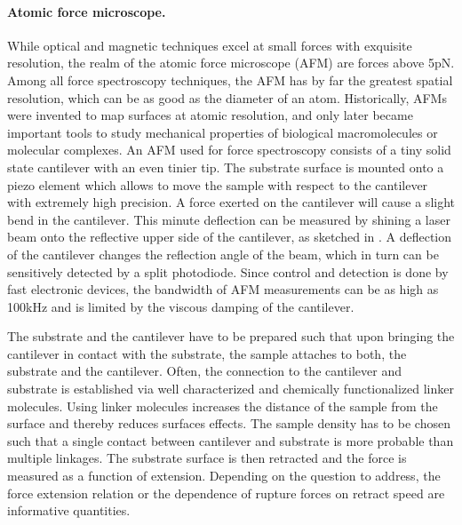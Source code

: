 \paragraph{Atomic force microscope.}
While optical and magnetic techniques excel at small forces with exquisite resolution, the realm 
of the atomic force microscope (AFM) are forces above 5pN. Among all force spectroscopy techniques,
the AFM has by far the greatest spatial resolution, which can be as good as the diameter of an atom.
Historically, AFMs were invented to map surfaces at atomic resolution, and only later became important tools
to study mechanical properties of biological macromolecules or molecular complexes. 
An AFM used for force spectroscopy consists of a tiny solid state cantilever with an even tinier tip. The substrate surface is mounted 
onto a piezo element which allows to move the sample with respect to the cantilever with extremely 
high precision. A force exerted on the cantilever will cause a slight bend in the cantilever. 
This minute deflection can be measured by shining a laser beam onto the reflective upper side of the 
cantilever, as sketched in . 
A deflection of the cantilever changes 
the reflection angle of the beam, which in turn can be sensitively detected by a split photodiode.
Since control and detection is done by fast electronic devices, 
the bandwidth of AFM measurements can be as high as 100kHz and
is limited by the viscous damping of the cantilever.

The substrate and the cantilever have to be prepared such that upon bringing the cantilever
in contact with the substrate, the sample attaches to both, the 
substrate and the cantilever. Often, the connection to the cantilever and substrate is 
established via well characterized and chemically functionalized linker molecules. 
Using linker molecules increases the distance of the sample from the surface and thereby reduces
surfaces effects. The sample density has to be chosen such that a single contact
between cantilever and substrate is more probable than multiple linkages. The substrate surface is then
retracted and the force is measured as a function of extension. Depending on the question 
to address, the force extension relation or the dependence of rupture forces on retract speed 
are informative quantities. 

